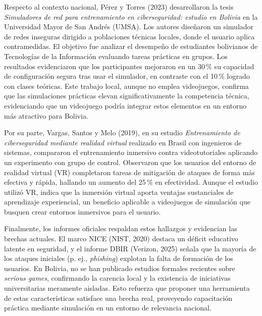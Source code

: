 Respecto al contexto nacional, Pérez y Torres (2023) desarrollaron la tesis \textit{Simuladores de red para entrenamiento en ciberseguridad: estudio en Bolivia} en la Universidad Mayor de San Andrés (UMSA). Los autores diseñaron un simulador de redes inseguras dirigido a poblaciones técnicas locales, donde el usuario aplica contramedidas. El objetivo fue analizar el desempeño de estudiantes bolivianos de Tecnologías de la Información evaluando tareas prácticas en grupos. Los resultados evidenciaron que los participantes mejoraron en un 30\,\% su capacidad de configuración segura tras usar el simulador, en contraste con el 10\,\% logrado con clases teóricas. Este trabajo local, aunque no emplea videojuegos, confirma que las simulaciones prácticas elevan significativamente la competencia técnica, evidenciando que un videojuego podría integrar estos elementos en un entorno más atractivo para Bolivia.

Por su parte, Vargas, Santos y Melo (2019), en su estudio \textit{Entrenamiento de ciberseguridad mediante realidad virtual} realizado en Brasil con ingenieros de sistemas, compararon el entrenamiento inmersivo contra videotutoriales aplicando un experimento con grupo de control. Observaron que los usuarios del entorno de realidad virtual (VR) completaron tareas de mitigación de ataques de forma más efectiva y rápida, hallando un aumento del 25\,\% en efectividad. Aunque el estudio utilizó VR, indica que la inmersión virtual aporta ventajas sustanciales de aprendizaje experiencial, un beneficio aplicable a videojuegos de simulación que busquen crear entornos inmersivos para el usuario.

Finalmente, los informes oficiales respaldan estos hallazgos y evidencian las brechas actuales. El marco NICE (NIST, 2020) destaca un déficit educativo latente en seguridad, y el informe DBIR (Verizon, 2025) señala que la mayoría de los ataques iniciales (p. ej., \textit{phishing}) explotan la falta de formación de los usuarios. En Bolivia, no se han publicado estudios formales recientes sobre \textit{serious games}, confirmando la carencia local y la existencia de iniciativas universitarias meramente aisladas. Esto refuerza que proponer una herramienta de estas características satisface una brecha real, proveyendo capacitación práctica mediante simulación en un entorno de relevancia nacional.
